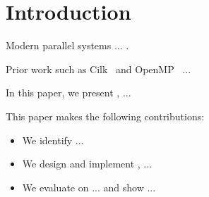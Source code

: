 \section{Introduction}
\label{sec:intro}

Modern parallel systems ... .

Prior work such as Cilk~\cite{blumofe1995cilk} and
OpenMP~\cite{dagum1998openmp} ...

In this paper, we present \sys, ...

This paper makes the following contributions:
\begin{itemize}
  \item We identify ...
  \item We design and implement \sys, ...
  \item We evaluate \sys on ... and show ...
\end{itemize}

